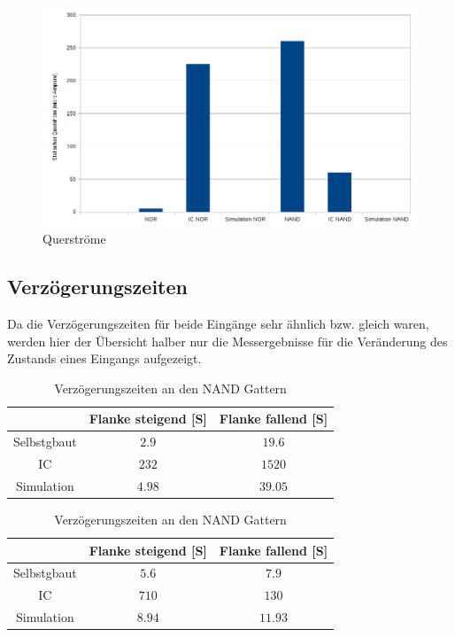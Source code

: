 \documentclass[11pt, a4paper]{article}
\begin{document}
\begin{figure}[H]
    \centering
    \includegraphics[width=\linewidth]{images/querstrom.png}
    \caption{Querströme}
    \label{graphQuerstrom}
\end{figure}


\subsection*{Verzögerungszeiten}
Da die Verzögerungszeiten für beide Eingänge sehr ähnlich bzw. gleich waren, werden hier der Übersicht halber nur die Messergebnisse für die Veränderung des Zustands eines Eingangs aufgezeigt.

\begin{table}[H]
	\center
	\begin{tabular}{c|c|c}
	& Flanke steigend [\si{\micro}S] & Flanke fallend [\si{\micro}S] 	\\ \hline
	Selbstgbaut & $2.9$ 	& $19.6$	\\
	IC 			& $232$ 	& $1520$	\\
	Simulation 	& $4.98$		& $39.05$\\
	\end{tabular}
	\caption{Verzögerungszeiten an den NOR Gattern}
	\label{verzögerungszeitenNOR}



	\center
	\begin{tabular}{c|c|c}
	& Flanke steigend [\si{\micro}S] & Flanke fallend [\si{\micro}S] 	\\ \hline
	Selbstgbaut & $5.6$ 	& $7.9$	\\
	IC 			& $710$ 	& $130$	\\
	Simulation 	& $8.94$		& $11.93$\\
	\end{tabular}
	\caption{Verzögerungszeiten an den NAND Gattern}
	\label{verzögerungszeitenNAND}
\end{table}
\end{document}

